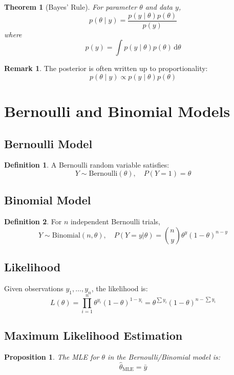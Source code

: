 \documentclass[12pt,oneside]{book}
\numberwithin{equation}{section}
\theoremstyle{definition}
\newtheorem{definition}{Definition}[section]
\newtheorem{remark}{Remark}[section]
\theoremstyle{plain}
\newtheorem{theorem}{Theorem}[section]
\newtheorem{proposition}{Proposition}[section]
\theoremstyle{remark}
\newcommand{\dd}{\,\mathrm{d}}
\newcommand{\Bern}{\mathrm{Bernoulli}}
\newcommand{\Bin}{\mathrm{Binomial}}
\begin{document}
\begin{theorem}[Bayes' Rule]
For parameter $\theta$ and data $y$,
$$
p(\theta \mid y) = \frac{p(y \mid \theta)p(\theta)}{p(y)}
$$
where
$$
p(y) = \int p(y \mid \theta)p(\theta)\dd \theta
$$
\end{theorem}

\begin{remark}
The posterior is often written up to proportionality:
$$
p(\theta \mid y) \propto p(y \mid \theta)p(\theta)
$$
\end{remark}

\section{Bernoulli and Binomial Models}

\subsection{Bernoulli Model}

\begin{definition}
A Bernoulli random variable satisfies:
$$
Y \sim \Bern(\theta), \quad P(Y=1)=\theta
$$
\end{definition}

\subsection{Binomial Model}

\begin{definition}
For $n$ independent Bernoulli trials,
$$
Y \sim \Bin(n,\theta), \quad P(Y=y|\theta) = \binom{n}{y}\theta^y(1-\theta)^{n-y}
$$
\end{definition}

\subsection{Likelihood}

Given observations $y_1,\dots,y_n$, the likelihood is:
$$
L(\theta) = \prod_{i=1}^n \theta^{y_i}(1-\theta)^{1-y_i}
= \theta^{\sum y_i}(1-\theta)^{n-\sum y_i}
$$

\subsection{Maximum Likelihood Estimation}

\begin{proposition}
The MLE for $\theta$ in the Bernoulli/Binomial model is:
$$
\hat{\theta}_{\text{MLE}} = \bar{y}
$$
\end{proposition}
\end{document}
